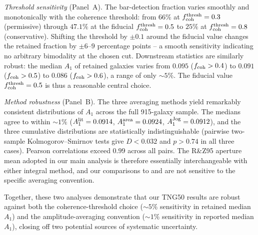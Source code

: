 \documentclass[fleqn,usenatbib]{mnras}
\newcommand{\Am}[1]{A_{#1}}
\newcommand{\Amone}{\ensuremath{\Am{1}}}
\begin{document}
\emph{Threshold sensitivity} (Panel~A).  The bar-detection fraction
varies smoothly and monotonically with the coherence threshold: from
$66\%$ at $f_{\rm coh}^{\rm thresh} = 0.3$ (permissive) through
$47.1\%$ at the fiducial $f_{\rm coh}^{\rm thresh} = 0.5$ to $25\%$
at $f_{\rm coh}^{\rm thresh} = 0.8$ (conservative).  Shifting the
threshold by $\pm 0.1$ around the fiducial value changes the
retained fraction by $\pm 6$--$9$ percentage points -- a smooth
sensitivity indicating no arbitrary bimodality at the chosen cut.
Downstream statistics are similarly robust: the median $\Amone$ of
retained galaxies varies from $0.095$ ($f_{\rm coh} > 0.4$) to
$0.091$ ($f_{\rm coh} > 0.5$) to $0.086$ ($f_{\rm coh} > 0.6$), a
range of only $\sim 5\%$.  The fiducial value
$f_{\rm coh}^{\rm thresh} = 0.5$ is thus a reasonable central choice.

\emph{Method robustness} (Panel~B).  The three averaging methods
yield remarkably consistent distributions of $\Amone$ across the
full 915-galaxy sample.  The medians agree to within $\sim 1\%$
($\Amone^{\rm lit} = 0.0914$,
$\Amone^{\rm area} = 0.0924$,
$\Amone^{\rm Jog} = 0.0912$), and the three cumulative distributions
are statistically indistinguishable (pairwise two-sample
Kolmogorov--Smirnov tests give $D < 0.032$ and $p > 0.74$ in all
three cases).  Pearson correlations exceed $0.99$ across all pairs.
The R\&Z95 aperture mean adopted in our main analysis is therefore
essentially interchangeable with either integral method, and our
comparisons to \citet{2013ApJ...772..135Z} and \citet{2022A&A...662A..53L} are not
sensitive to the specific averaging convention.

Together, these two analyses demonstrate that our TNG50 results are
robust against both the coherence-threshold choice ($\sim 5\%$
sensitivity in retained median $\Amone$) and the amplitude-averaging
convention ($\sim 1\%$ sensitivity in reported median $\Amone$),
closing off two potential sources of systematic uncertainty.
\end{document}
